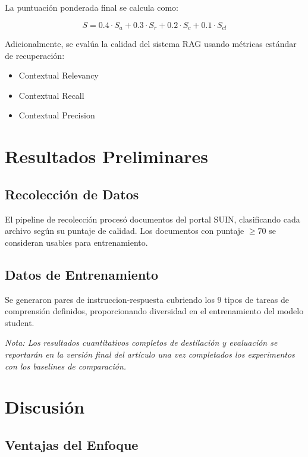 \documentclass[conference]{IEEEtran}
\begin{document}
La puntuaci\'on ponderada final se calcula como:

\begin{equation}
    S = 0.4 \cdot S_a + 0.3 \cdot S_r + 0.2 \cdot S_c + 0.1 \cdot S_{cl}
\end{equation}

Adicionalmente, se eval\'ua la calidad del sistema RAG usando m\'etricas est\'andar de recuperaci\'on:
\begin{itemize}
    \item Contextual Relevancy
    \item Contextual Recall
    \item Contextual Precision
\end{itemize}

\section{Resultados Preliminares}
\label{sec:results}

\subsection{Recolecci\'on de Datos}

El pipeline de recolecci\'on proces\'o documentos del portal SUIN, clasificando cada archivo seg\'un su puntaje de calidad. Los documentos con puntaje $\geq 70$ se consideran usables para entrenamiento.

\subsection{Datos de Entrenamiento}

Se generaron pares de instruccion-respuesta cubriendo los 9 tipos de tareas de comprensi\'on definidos, proporcionando diversidad en el entrenamiento del modelo student.

\textit{Nota: Los resultados cuantitativos completos de destilaci\'on y evaluaci\'on se reportar\'an en la versi\'on final del art\'iculo una vez completados los experimentos con los baselines de comparaci\'on.}

\section{Discusi\'on}
\label{sec:discussion}

\subsection{Ventajas del Enfoque}
\end{document}
